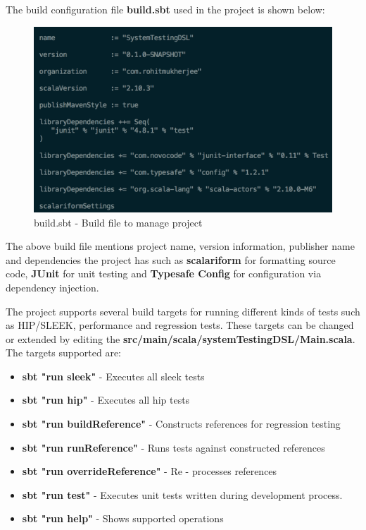 The build configuration file \textbf{build.sbt} used in the project is shown below:

\begin{figure}[H]
  \centering
    \includegraphics[width=500px]{figures/build_sbt.png}
  \caption{build.sbt - Build file to manage project}
\end{figure}

\noindent
The above build file mentions project name, version information, publisher name and dependencies the project has such as \textbf{scalariform} for formatting source code, \textbf{JUnit} for unit testing and \textbf{Typesafe Config} for configuration via dependency injection.
\bigskip

\noindent
The project supports several build targets for running different kinds of tests such as HIP/SLEEK, performance and regression tests. These targets can be changed or extended by editing the \textbf{src/main/scala/systemTestingDSL/Main.scala}. The targets supported are:
\begin{itemize}
\item \textbf{sbt "run sleek"} - Executes all sleek tests
\item \textbf{sbt "run hip"} - Executes all hip tests
\item \textbf{sbt "run buildReference"} - Constructs references for regression testing
\item \textbf{sbt "run runReference"} - Runs tests against constructed references
\item \textbf{sbt "run overrideReference"} - Re - processes references
\item \textbf{sbt "run test"} - Executes unit tests written during development process.
\item \textbf{sbt "run help"} - Shows supported operations
\end{itemize}
\newpage